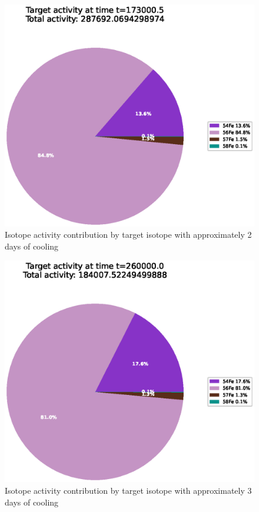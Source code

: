 \begin{figure}[!htb]
\centering
\includegraphics[width=0.8\linewidth]{chapters/activity_code/fe-activity-v2/target-activity/0233_173000.eps}
\caption{Isotope activity contribution by target isotope with approximately 2 days of cooling}
\label{fig:activity-v2-target-activity-173000s}
\end{figure}

\begin{figure}[!htb]
\centering
\includegraphics[width=0.8\linewidth]{chapters/activity_code/fe-activity-v2/target-activity/0300_260000.eps}
\caption{Isotope activity contribution by target isotope with approximately 3 days of cooling}
\label{fig:activity-v2-target-activity-260000s}
\end{figure}




